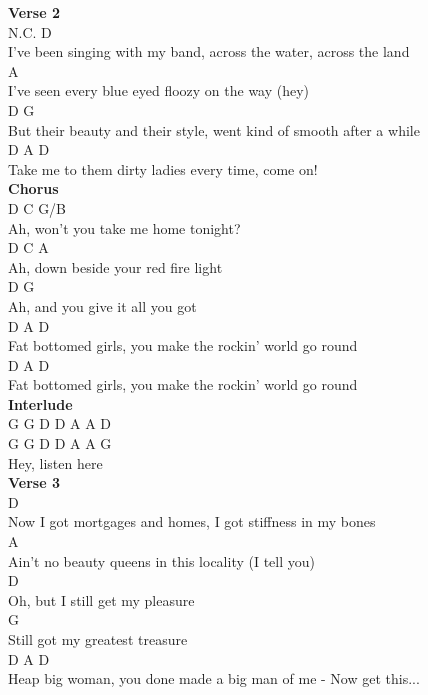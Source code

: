 \documentclass[a4paper]{article}
\begin{document}
{{        }
        \textbf{Verse 2}
        ~\\
        {
            \cutive
            \obeyspaces
N.C.      D
\\
I've been singing with my band, across the water, across the land
\\
                                        A
\\
I've seen every blue eyed floozy on the way  (hey)
\\
          D                                    G
\\
But their beauty and their style, went kind of smooth after a while
\\
        D             A            D
\\
Take me to them dirty ladies every time, come on!
\\

        }
        \textbf{Chorus}
        ~\\
        {
            \cutive
            \obeyspaces
D             C              G/B
\\
Ah, won't you take me home tonight?
\\
D          C                  A
\\
Ah, down beside your red fire light
\\
D           G
\\
Ah, and you give it all you got
\\
             D                   A                D
\\
Fat bottomed girls, you make the rockin' world go round
\\
             D                   A                D
\\
Fat bottomed girls, you make the rockin' world go round
\\

        }
        \textbf{Interlude}
        ~\\
        {
            \cutive
            \obeyspaces
G  G  D  D  A A  D
\\
G  G  D  D  A A  G
\\
                Hey, listen here
\\

        }
        \textbf{Verse 3}
        ~\\
        {
            \cutive
            \obeyspaces
          D
\\
Now I got mortgages and homes, I got stiffness in my bones
\\
                                     A
\\
Ain't no beauty queens in this locality (I tell you)
\\
        D
\\
Oh, but I still get my pleasure
\\
      G
\\
Still got my greatest treasure
\\
         D               A                 D
\\
Heap big woman, you done made a big man of me   - Now get this...
\\

}}
\end{document}
